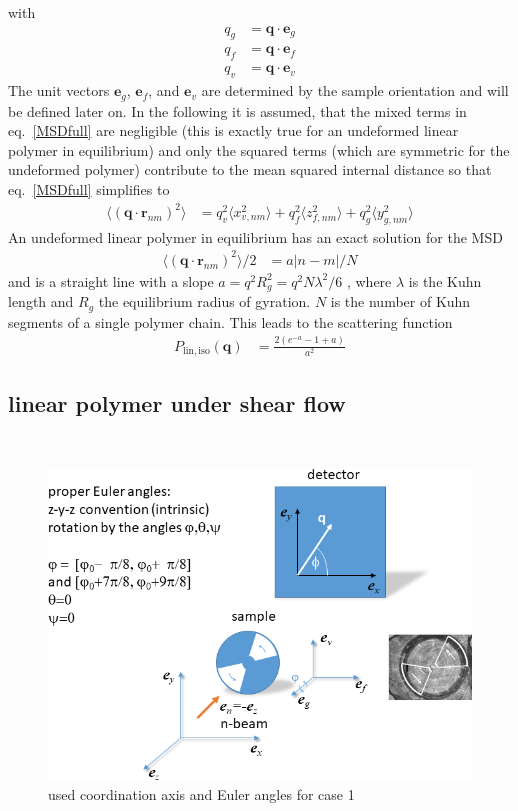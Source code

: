 with
\begin{align}
  q_g &= \mathbf{q}\cdot \mathbf{e}_g \label{eq:eg} \\
  q_f &= \mathbf{q}\cdot \mathbf{e}_f \label{eq:ef} \\
  q_v &= \mathbf{q}\cdot \mathbf{e}_v \label{eq:ev}
\end{align}
The unit vectors $\mathbf{e}_g$, $\mathbf{e}_f$, and $\mathbf{e}_v$ are determined by the sample orientation and will be defined later on. In the following it is assumed, that the mixed terms in eq.\ \ref{MSDfull} are negligible (this is exactly true for an undeformed linear polymer in equilibrium) and only the squared terms (which are symmetric for the undeformed polymer) contribute to the mean squared internal distance so that eq.\ \ref{MSDfull} simplifies to
\begin{align} \label{MSDused}
 \langle(\mathbf{q}\cdot\mathbf{r}_{nm})^2\rangle  & = q_v^2 \langle x_{v,nm}^2\rangle + q_f^2 \langle z_{f,nm}^2\rangle + q_g^2 \langle y_{g,nm}^2\rangle
 \end{align}
An undeformed linear polymer in equilibrium has an exact solution for the MSD
\begin{align}\label{MSDequilibrium}
  \langle(\mathbf{q}\cdot\mathbf{r}_{nm})^2\rangle/2 & = a |n-m|/N
\end{align}
and is a straight line with a slope $a=q^2R_g^2=q^2N\lambda^2/6$ , where $\lambda$ is the
Kuhn length and $R_g$ the equilibrium radius of gyration. $N$ is the number of Kuhn segments of a single polymer chain. This leads to the scattering function
\begin{align}
  P_\mathrm{lin,iso}(\mathbf{q}) & = \frac{2\left(e^{-a}-1+a\right)}{a^2}
\end{align}

\subsection{linear polymer under shear flow}~\\
\label{sect:LinearPolymerShearFlow}

\begin{figure}[htb]
  \centering
  \includegraphics[width=.8\textwidth]{../images/form_factor/deformed_sheared/Euler_case1.png}
  \caption{used coordination axis and Euler angles for case 1}\label{fig:EulerCase1}
\end{figure}

